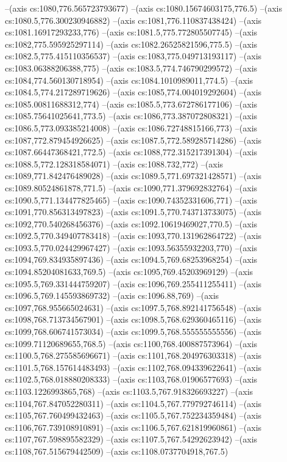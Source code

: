 --(axis cs:1080,776.565723793677)
--(axis cs:1080.15674603175,776.5)
--(axis cs:1080.5,776.300230946882)
--(axis cs:1081,776.110837438424)
--(axis cs:1081.16917293233,776)
--(axis cs:1081.5,775.772805507745)
--(axis cs:1082,775.595925297114)
--(axis cs:1082.26525821596,775.5)
--(axis cs:1082.5,775.415110356537)
--(axis cs:1083,775.049713193117)
--(axis cs:1083.06388206388,775)
--(axis cs:1083.5,774.746790299572)
--(axis cs:1084,774.560130718954)
--(axis cs:1084.1010989011,774.5)
--(axis cs:1084.5,774.217289719626)
--(axis cs:1085,774.004019292604)
--(axis cs:1085.00811688312,774)
--(axis cs:1085.5,773.672786177106)
--(axis cs:1085.75641025641,773.5)
--(axis cs:1086,773.387072808321)
--(axis cs:1086.5,773.093385214008)
--(axis cs:1086.72748815166,773)
--(axis cs:1087,772.879454926625)
--(axis cs:1087.5,772.589285714286)
--(axis cs:1087.66447368421,772.5)
--(axis cs:1088,772.315217391304)
--(axis cs:1088.5,772.128318584071)
--(axis cs:1088.732,772)
--(axis cs:1089,771.842476489028)
--(axis cs:1089.5,771.697321428571)
--(axis cs:1089.80524861878,771.5)
--(axis cs:1090,771.379692832764)
--(axis cs:1090.5,771.134477825465)
--(axis cs:1090.74352331606,771)
--(axis cs:1091,770.856313497823)
--(axis cs:1091.5,770.743713733075)
--(axis cs:1092,770.540268456376)
--(axis cs:1092.10619469027,770.5)
--(axis cs:1092.5,770.349407783418)
--(axis cs:1093,770.131962864722)
--(axis cs:1093.5,770.024429967427)
--(axis cs:1093.56355932203,770)
--(axis cs:1094,769.834935897436)
--(axis cs:1094.5,769.68253968254)
--(axis cs:1094.85204081633,769.5)
--(axis cs:1095,769.45203969129)
--(axis cs:1095.5,769.331444759207)
--(axis cs:1096,769.255411255411)
--(axis cs:1096.5,769.145593869732)
--(axis cs:1096.88,769)
--(axis cs:1097,768.955665024631)
--(axis cs:1097.5,768.892141756548)
--(axis cs:1098,768.713734567901)
--(axis cs:1098.5,768.629360465116)
--(axis cs:1099,768.606741573034)
--(axis cs:1099.5,768.555555555556)
--(axis cs:1099.71120689655,768.5)
--(axis cs:1100,768.400887573964)
--(axis cs:1100.5,768.275585696671)
--(axis cs:1101,768.204976303318)
--(axis cs:1101.5,768.157614483493)
--(axis cs:1102,768.094339622641)
--(axis cs:1102.5,768.018880208333)
--(axis cs:1103,768.01906577693)
--(axis cs:1103.1226993865,768)
--(axis cs:1103.5,767.918326693227)
--(axis cs:1104,767.847052280311)
--(axis cs:1104.5,767.779792746114)
--(axis cs:1105,767.760499432463)
--(axis cs:1105.5,767.752234359484)
--(axis cs:1106,767.739108910891)
--(axis cs:1106.5,767.621819960861)
--(axis cs:1107,767.598895582329)
--(axis cs:1107.5,767.54292623942)
--(axis cs:1108,767.515679442509)
--(axis cs:1108.0737704918,767.5)
